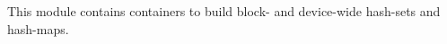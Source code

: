 \begin{DoxyParagraph}{}
This module contains containers to build block-\/ and device-\/wide hash-\/sets and hash-\/maps. 
\end{DoxyParagraph}
